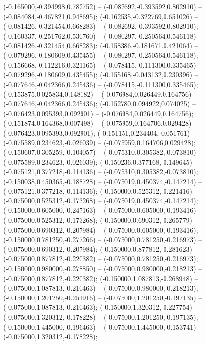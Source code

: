  (-0.165000,-0.394998,0.782752) -- (-0.082692,-0.393592,0.802910) -- (-0.084084,-0.467821,0.948695);
 (-0.162535,-0.322769,0.651026) -- (-0.081426,-0.321454,0.668283) -- (-0.082692,-0.393592,0.802910);
 (-0.160337,-0.251762,0.530760) -- (-0.080297,-0.250564,0.546118) -- (-0.081426,-0.321454,0.668283);
 (-0.158386,-0.181671,0.421064) -- (-0.079296,-0.180609,0.435455) -- (-0.080297,-0.250564,0.546118);
 (-0.156668,-0.112216,0.321165) -- (-0.078415,-0.111300,0.335465) -- (-0.079296,-0.180609,0.435455);
 (-0.155168,-0.043132,0.230396) -- (-0.077646,-0.042366,0.245436) -- (-0.078415,-0.111300,0.335465);
 (-0.153875,0.025834,0.148182) -- (-0.076984,0.026449,0.164756) -- (-0.077646,-0.042366,0.245436);
 (-0.152780,0.094922,0.074025) -- (-0.076423,0.095393,0.092901) -- (-0.076984,0.026449,0.164756);
 (-0.151874,0.164368,0.007498) -- (-0.075959,0.164706,0.029428) -- (-0.076423,0.095393,0.092901);
 (-0.151151,0.234404,-0.051761) -- (-0.075589,0.234623,-0.026039) -- (-0.075959,0.164706,0.029428);
 (-0.150607,0.305259,-0.104057) -- (-0.075310,0.305382,-0.073810) -- (-0.075589,0.234623,-0.026039);
 (-0.150236,0.377168,-0.149645) -- (-0.075121,0.377218,-0.114136) -- (-0.075310,0.305382,-0.073810);
 (-0.150038,0.450365,-0.188728) -- (-0.075019,0.450374,-0.147214) -- (-0.075121,0.377218,-0.114136);
 (-0.150000,0.525312,-0.221416) -- (-0.075000,0.525312,-0.173268) -- (-0.075019,0.450374,-0.147214);
 (-0.150000,0.605000,-0.247163) -- (-0.075000,0.605000,-0.193416) -- (-0.075000,0.525312,-0.173268);
 (-0.150000,0.690312,-0.265779) -- (-0.075000,0.690312,-0.207984) -- (-0.075000,0.605000,-0.193416);
 (-0.150000,0.781250,-0.277266) -- (-0.075000,0.781250,-0.216973) -- (-0.075000,0.690312,-0.207984);
 (-0.150000,0.877812,-0.281623) -- (-0.075000,0.877812,-0.220382) -- (-0.075000,0.781250,-0.216973);
 (-0.150000,0.980000,-0.278850) -- (-0.075000,0.980000,-0.218213) -- (-0.075000,0.877812,-0.220382);
 (-0.150000,1.087813,-0.268948) -- (-0.075000,1.087813,-0.210463) -- (-0.075000,0.980000,-0.218213);
 (-0.150000,1.201250,-0.251916) -- (-0.075000,1.201250,-0.197135) -- (-0.075000,1.087813,-0.210463);
 (-0.150000,1.320312,-0.227754) -- (-0.075000,1.320312,-0.178228) -- (-0.075000,1.201250,-0.197135);
 (-0.150000,1.445000,-0.196463) -- (-0.075000,1.445000,-0.153741) -- (-0.075000,1.320312,-0.178228);
